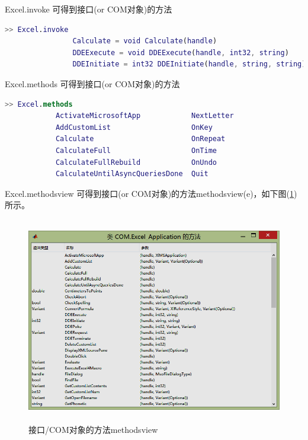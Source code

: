            Excel.invoke 可得到接口(or COM对象)的方法
            \begin{lstlisting}[language=Matlab]
            >> Excel.invoke
                Calculate = void Calculate(handle)
                DDEExecute = void DDEExecute(handle, int32, string)
                DDEInitiate = int32 DDEInitiate(handle, string, string)
            \end{lstlisting}
            Excel.methods 可得到接口(or COM对象)的方法
            \begin{lstlisting}[language=Matlab]
            >> Excel.methods
            ActivateMicrosoftApp            NextLetter
            AddCustomList                   OnKey
            Calculate                       OnRepeat
            CalculateFull                   OnTime
            CalculateFullRebuild            OnUndo
            CalculateUntilAsyncQueriesDone  Quit
            \end{lstlisting}
            Excel.methodsview 可得到接口(or COM对象)的方法methodsview(e)，如下图(\ref{接口/COM对象的方法methodsview})所示。
            \begin{figure}[H]
            \centering
            \includegraphics[height=9cm]{images/Link_8.jpg}
            \caption{接口/COM对象的方法methodsview}
            \label{接口/COM对象的方法methodsview}
            \end{figure}
